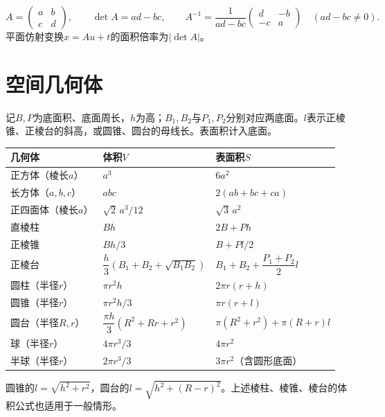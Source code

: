 \begin{equation*}
 A=\begin{pmatrix}a&b\\c&d\end{pmatrix},\qquad \det A=ad-bc,\qquad
 A^{-1}=\frac1{ad-bc}\begin{pmatrix}d&-b\\-c&a\end{pmatrix}\quad(ad-bc\ne0).
\end{equation*}
平面仿射变换\(x=Au+t\)的面积倍率为\(|\det A|\)。

\section{空间几何体}

记\(B,P\)为底面积、底面周长，\(h\)为高；\(B_1,B_2\)与\(P_1,P_2\)分别对应两底面。\(l\)表示正棱锥、正棱台的斜高，或圆锥、圆台的母线长。表面积计入底面。
\begingroup
\renewcommand{\arraystretch}{1.15}
\begin{longtable}{@{}p{.22\linewidth}p{.31\linewidth}p{.41\linewidth}@{}}
\toprule
几何体 & 体积\(V\) & 表面积\(S\) \\
\midrule
\endhead
正方体（棱长\(a\)） & \(a^3\) & \(6a^2\) \\
长方体（\(a,b,c\)） & \(abc\) & \(2(ab+bc+ca)\) \\
正四面体（棱长\(a\)） & \(\sqrt2\,a^3/12\) & \(\sqrt3\,a^2\) \\
直棱柱 & \(Bh\) & \(2B+Ph\) \\
正棱锥 & \(Bh/3\) & \(B+Pl/2\) \\
正棱台 & \(\dfrac h3(B_1+B_2+\sqrt{B_1B_2})\) & \(B_1+B_2+\dfrac{P_1+P_2}{2}l\) \\
圆柱（半径\(r\)） & \(\pi r^2h\) & \(2\pi r(r+h)\) \\
圆锥（半径\(r\)） & \(\pi r^2h/3\) & \(\pi r(r+l)\) \\
圆台（半径\(R,r\)） & \(\dfrac{\pi h}{3}(R^2+Rr+r^2)\) & \(\pi(R^2+r^2)+\pi(R+r)l\) \\
球（半径\(r\)） & \(4\pi r^3/3\) & \(4\pi r^2\) \\
半球（半径\(r\)） & \(2\pi r^3/3\) & \(3\pi r^2\)（含圆形底面） \\
\bottomrule
\end{longtable}
\endgroup
圆锥的\(l=\sqrt{h^2+r^2}\)，圆台的\(l=\sqrt{h^2+(R-r)^2}\)。上述棱柱、棱锥、棱台的体积公式也适用于一般情形。

